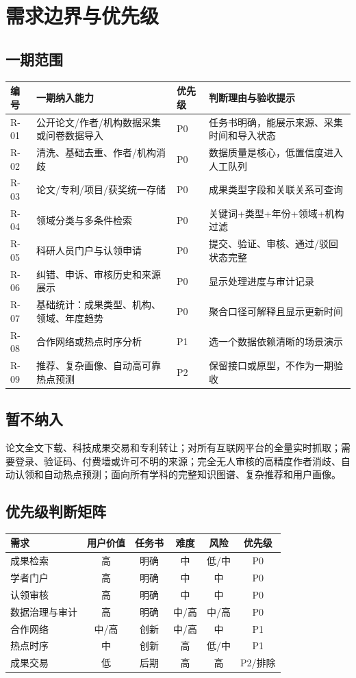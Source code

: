 \documentclass[UTF8,11pt,a4paper]{ctexart}
\begin{document}
\section{需求边界与优先级}
\subsection{一期范围}
\begin{longtable}{p{1.2cm}p{5.7cm}p{1.4cm}p{5.7cm}}
\toprule 编号 & 一期纳入能力 & 优先级 & 判断理由与验收提示\\\midrule
R-01 & 公开论文/作者/机构数据采集或问卷数据导入 & P0 & 任务书明确，能展示来源、采集时间和导入状态\\
R-02 & 清洗、基础去重、作者/机构消歧 & P0 & 数据质量是核心，低置信度进入人工队列\\
R-03 & 论文/专利/项目/获奖统一存储 & P0 & 成果类型字段和关联关系可查询\\
R-04 & 领域分类与多条件检索 & P0 & 关键词+类型+年份+领域+机构过滤\\
R-05 & 科研人员门户与认领申请 & P0 & 提交、验证、审核、通过/驳回状态完整\\
R-06 & 纠错、申诉、审核历史和来源展示 & P0 & 显示处理进度与审计记录\\
R-07 & 基础统计：成果类型、机构、领域、年度趋势 & P0 & 聚合口径可解释且显示更新时间\\
R-08 & 合作网络或热点时序分析 & P1 & 选一个数据依赖清晰的场景演示\\
R-09 & 推荐、复杂画像、自动高可靠热点预测 & P2 & 保留接口或原型，不作为一期验收\\\bottomrule
\end{longtable}
\subsection{暂不纳入}
论文全文下载、科技成果交易和专利转让；对所有互联网平台的全量实时抓取；需要登录、验证码、付费墙或许可不明的来源；完全无人审核的高精度作者消歧、自动认领和自动热点预测；面向所有学科的完整知识图谱、复杂推荐和用户画像。

\subsection{优先级判断矩阵}
\begin{longtable}{p{4.6cm}C C C C C}
\toprule 需求 & 用户价值 & 任务书 & 难度 & 风险 & 优先级\\\midrule
成果检索 & 高 & 明确 & 中 & 低/中 & P0\\
学者门户 & 高 & 明确 & 中 & 中 & P0\\
认领审核 & 高 & 明确 & 中 & 中 & P0\\
数据治理与审计 & 高 & 明确 & 中/高 & 中/高 & P0\\
合作网络 & 中/高 & 创新 & 中/高 & 中 & P1\\
热点时序 & 中 & 创新 & 高 & 低/中 & P1\\
成果交易 & 低 & 后期 & 高 & 高 & P2/排除\\\bottomrule
\end{longtable}
\end{document}
